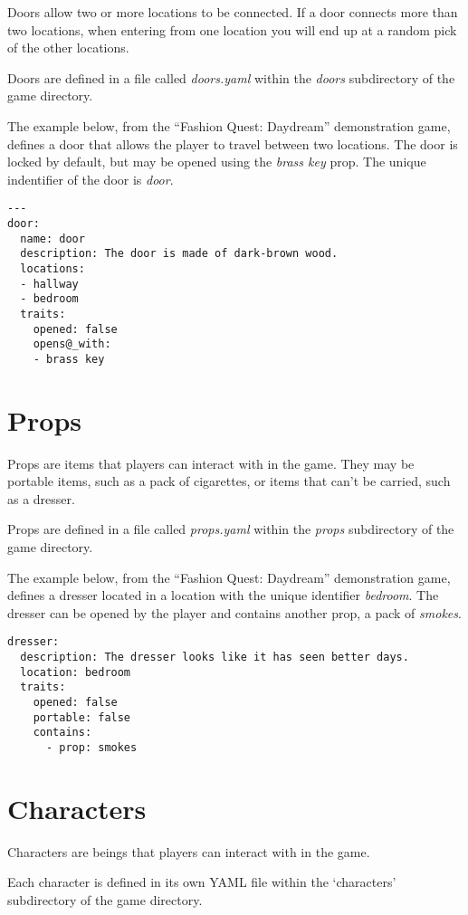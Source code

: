 \documentclass[letterpaper,10pt,english]{manual}
\begin{document}
Doors allow two or more locations to be connected. If a door connects more than two locations, when entering from one location you will end up at a random pick of the other locations.

Doors are defined in a file called \emph{doors.yaml} within the \emph{doors} subdirectory of the game directory.

The example below, from the ``Fashion Quest: Daydream'' demonstration game, defines a door that allows the player to travel between two locations. The door is locked by default, but may be opened using the \emph{brass key} prop. The unique indentifier of the door is \emph{door}.

\begin{Verbatim}[commandchars=@\[\]]
---
door:
  name: door
  description: The door is made of dark-brown wood.
  locations:
  - hallway
  - bedroom
  traits:
    opened: false
    opens@_with:
    - brass key
\end{Verbatim}


\section{Props}

Props are items that players can interact with in the game. They may be portable items, such as a pack of cigarettes, or items that can't be carried, such as a dresser.

Props are defined in a file called \emph{props.yaml} within the \emph{props} subdirectory of the game directory.

The example below, from the ``Fashion Quest: Daydream'' demonstration game, defines a dresser located in a location with the unique identifier \emph{bedroom}. The dresser can be opened by the player and contains another prop, a pack of \emph{smokes}.

\begin{Verbatim}[commandchars=@\[\]]
dresser:
  description: The dresser looks like it has seen better days.
  location: bedroom
  traits:
    opened: false
    portable: false
    contains:
      - prop: smokes
\end{Verbatim}


\section{Characters}

Characters are beings that players can interact with in the game.

Each character is defined in its own YAML file within the `characters' subdirectory of the game directory.
\end{document}
